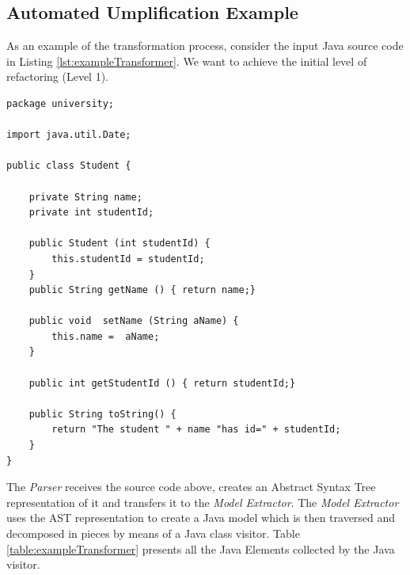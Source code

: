 \subsection{Automated Umplification Example}

As an example of the transformation process, consider the input Java source code in Listing \ref{lst:exampleTransformer}.
We want to achieve the initial level of refactoring (Level 1).

\begin{lstlisting}[style=java, caption=Input source code, label=lst:exampleTransformer]
package university;

import java.util.Date;

public class Student {
	
    private String name;
    private int studentId;
    
    public Student (int studentId) {
    	this.studentId = studentId;
    }
    public String getName () { return name;}
    
    public void  setName (String aName) { 
    	this.name =  aName;
    }
   
    public int getStudentId () { return studentId;}
    
    public String toString() {
    	return "The student " + name "has id=" + studentId;
    }
}   
\end{lstlisting}

The \textit{Parser} receives the source code above, creates an Abstract Syntax Tree representation of it and transfers it to the \textit{Model Extractor}. The \textit{Model Extractor} uses the AST representation to create a Java model which is then traversed and decomposed in pieces by means of a Java class visitor. Table \ref{table:exampleTransformer} presents all the Java Elements collected by the Java visitor.

